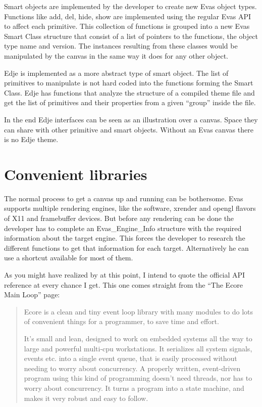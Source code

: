 \documentclass[12pt,a4paper,english]{book}
\begin{document}
Smart objects are implemented by the developer to create new Evas object types.
Functions like add, del, hide, show are implemented using the regular Evas API
to affect each primitive. This collection of functions is grouped into a new
Evas Smart Class structure that consist of a list of pointers to the functions,
the object type name and version. The instances resulting from these classes
would be manipulated by the canvas in the same way it does for any other
object.

Edje is implemented as a more abstract type of smart object. The list of
primitives to manipulate is not hard coded into the functions forming the Smart
Class. Edje has functions that analyze the structure of a compiled theme file
and get the list of primitives and their properties from a given ``group'' inside
the file.

In the end Edje interfaces can be seen as an illustration over a canvas. Space
they can share with other primitive and smart objects. Without an Evas canvas
there is no Edje theme.



\hypertarget{convenient-libraries}{}
\section{Convenient libraries}
\label{convenient-libraries}

The normal process to get a canvas up and running can be bothersome. Evas
supports multiple rendering engines, like the software, xrender and opengl
flavors of X11 and framebuffer devices. But before any rendering can be done
the developer has to complete an Evas{\_}Engine{\_}Info structure with the required
information about the target engine. This forces the developer to research the
different functions to get that information for each target. Alternatively he
can use a shortcut available for most of them.

As you might have realized by at this point, I intend to quote the official API
reference at every chance I get. This one comes straight from the ``The Ecore
Main Loop'' page:
\begin{quote}

Ecore is a clean and tiny event loop library with many modules to do lots
of convenient things for a programmer, to save time and effort.

It's small and lean, designed to work on embedded systems all the way to
large and powerful multi-cpu workstations. It serializes all system
signals, events etc. into a single event queue, that is easily processed
without needing to worry about concurrency. A properly written,
event-driven program using this kind of programming doesn't need threads,
nor has to worry about concurrency. It turns a program into a state
machine, and makes it very robust and easy to follow.
\end{quote}
\end{document}
